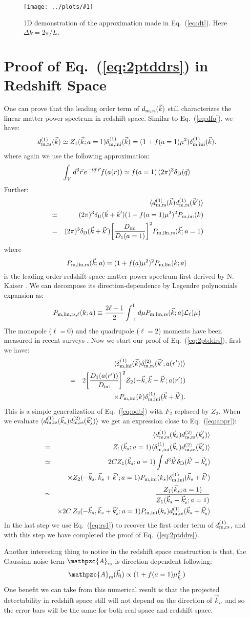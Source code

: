 \documentclass[prd,amsmath,amssymb,floatfix,superscriptaddress,nofootinbib,twocolumn]{revtex4-1}
\def\be{\begin{equation}}
\def\ee{\end{equation}}
\def\bea{\begin{eqnarray}}
\def\eea{\end{eqnarray}}
\newcommand{\rs}{\rm rs}
\newcommand{\ini}{\rm ini}
\newcommand{\vrr}{\vec{r}}
\newcommand{\vs}{\nonumber\\}
\newcommand{\vk}{\vec{k}}
\newcommand{\ec}[1]{Eq.~(\ref{eq:#1})}
\newcommand{\eql}[1]{\label{eq:#1}}
\newcommand{\sfig}[2]{
\texttt{[image: ../plots/\#1]}
        }
\newcommand{\Sfig}[2]{
   \begin{figure}[thbp]
   \begin{center}
    \sfig{../plots/#1.pdf}{\columnwidth}
    \caption{{\small #2}}
    \label{fig:#1}
     \end{center}
   \end{figure}
}
\begin{document}
\Sfig{approx}{1D demonstration of the approximation made in \ec{dt}. Here $\Delta k=2\pi /L$.}

\section{Proof of \ec{2ptddrs} in Redshift Space} \label{appendb}
One can prove that the leading order term of $d_{\rm m,rs}(\vk)$ still characterizes the linear matter power spectrum in redshift space. Similar to \ec{dfo}, we have:
\be
d^{( 1)}_{\rm m,rs}(\vk)\simeq Z_{1}(\vk;a=1)\dmi^{(1)}(\vk)=(1+f(a=1)\mu^2)\dmi^{(1)}(\vk).\eql{rs1}
\ee
where again we use the following approximation:
\be 
\int_{V} d^{3}\vrr\, e^{-i\vec{q}\cdot\vrr}f(a(r))  \simeq f(a=1)\,(2\pi)^3\delta_{\rm D}(\vec{q})
\ee 
Further:
\bea 
&&\langle d^{( 1)}_{\rm m,rs}(\vk) d^{(1)}_{\rm m,rs}(\vk') \rangle\vs
& \simeq&(2\pi)^3 \delta_{\rm D}(\vk+\vk')(1+f(a=1)\mu^2)^2 P_{\rm m,ini}(k)\vs
&= &(2\pi)^3 \delta_{\rm D}(\vk+\vk')\bigg[ \frac{D_{\ini}}{D_1(a=1)}\bigg]^2 P_{\rm m,lin,rs}(\vk;a=1)\vs \eql{lpsrs}
\eea 
where 
\be 
P_{\rm m,lin,rs}(\vk;a)=(1+f(a)\mu^2)^2 P_{\rm m,lin}(k;a) \eql{kaiser}
\ee 
is the leading order redshift space matter power spectrum first derived by N. Kaiser \cite{Kaiser:1987rsd}. We can decompose its direction-dependence by Legendre polynomials expansion as:
\be 
P_{\rm m,lin,rs,\ell}(k;a)\equiv \frac{2\ell+1}{2}\int_{-1}^{1}d\mu P_{\rm m,lin,rs}(\vk;a) \mathcal{L}_{\ell}(\mu)
\ee 
The monopole ($\ell=0$) and the quadrupole ($\ell=2$) moments have been measured in recent surveys \cite{Gil-Marin:2015sqa}. Now we start our proof of \ec{2ptddrs}, first we have:
\bea 
&&\langle \dmi^{(1)}(\vk)\delta_{\rm m,\rs}^{(2)}(\vk';a(r'))\rangle\vs 
&=&2\bigg[\frac{D_{1}(a(r'))}{D_{\ini}} \bigg]^{2}Z_{2}(-\vk,\vk+\vk';a(r')) \vs
& &\times P_{\rm m,\ini}(k)\dmi^{(1)}(\vk+\vk').\vs
\eea 
This is a simple generalization of \ec{odb} with $F_2$ replaced by $Z_2$. When we evaluate $\langle d_{\rm m,\rs}^{(1)}(\vk_s) d_{\rm m,\rs}^{(2)}(\vk'_s)\rangle$ we get an expression close to \ec{appr}:
\bea 
&& \langle d^{(1)}_{\rm m,\rs}(\vk_s)d^{(2)}_{\rm m,\rs}(\vk_s') \rangle \vs 
&=&  Z_{1}(\vk_s;a=1)\langle \dmi^{(1)}(\vk_s)d^{(2)}_{\rm m,\rs}(\vk_s') \rangle\vs
&\simeq &2CZ_{1}(\vk_s;a=1)\int {d^{3}\vk'}\delta_{\rm D}(\vk'-\vk_s') \vs
&&\times Z_{2}(-\vk_s,\vk_s+\vk';a=1)P_{\rm m,\ini}(k_s)\dmi^{(1)}(\vk_s+\vk') \vs
&\simeq & \frac{Z_{1}(\vk_s;a=1 )}{Z_{1}(\vk_s+\vk_s';a=1)} \vs 
&&\times2C\,Z_{2}(-\vk_s,\vk_s+\vk_s';a=1) P_{\rm m,\ini}(k_s)d_{\rm m,rs}^{(1)}(\vk_s+\vk_s') \vs\eql{apprrs}
\eea 
In the last step we use \ec{rs1} to recover the first order term of $d_{\rm m,rs}^{(1)}$, and with this step we have completed the proof of \ec{2ptddrs}.

Another interesting thing to notice in the redshift space construction is that, the Gaussian noise term $\mathpzc{A}_{\rs}$ is direction-dependent following:
\be 
\mathpzc{A}_{\rs}(\vk_l)\propto(1+f(a=1)\mu_{\vk_l}^{2})
\ee 
One benefit we can take from this numerical result is that the projected detectability in redshift space still will not depend on the direction of $\vk_l$, and so the error bars will be the same for both real space and redshift space.




\end{document}
